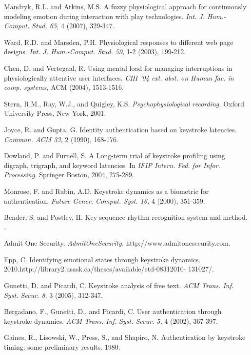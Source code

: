 \begin{thebibliography}{9}
Mandryk, R.L. and Atkins, M.S. A fuzzy physiological
approach for continuously modeling emotion during
interaction with play technologies.
\textit{ Int. J. Hum.-
Comput. Stud. 65,} 4 (2007), 329-347.


Ward, R.D. and Marsden, P.H. Physiological responses
to different web page designs.
\textit{ Int. J. Hum.-Comput.
Stud. 59, } 1-2 (2003), 199-212.


Chen, D. and Vertegaal, R. Using mental load for
managing interruptions in physiologically attentive
user interfaces.
\textit{ CHI '04 ext. abst. on Human fac. in
comp. systems, } ACM (2004), 1513-1516.


Stern, R.M., Ray, W.J., and Quigley, K.S.
\textit{ Psychophysiological recording. } Oxford University
Press, New York, 2001.


Joyce, R. and Gupta, G. Identity authentication based
on keystroke latencies.
\textit{ Commun. ACM 33, } 2 (1990),
168-176.

Dowland, P. and Furnell, S. A Long-term trial of
keystroke profiling using digraph, trigraph, and
keyword latencies. In
\textit{ IFIP Intern. Fed. for Infor.
Processing. } Springer Boston, 2004, 275-289.

Monrose, F. and Rubin, A.D. Keystroke dynamics as a biometric for authentication.
\textit{ Future Gener. Comput.
Syst. 16, } 4 (2000), 351-359.


Bender, S. and Postley, H. Key sequence rhythm
recognition system and method. .

Admit One Security.
\textit{ AdmitOneSecurity. } http://www.admitonesecurity.com.


Epp, C. Identifying emotional states through keystroke
dynamics. 2010.http://library2.usask.ca/theses/available/etd-08312010-
131027/.


Gunetti, D. and Picardi, C. Keystroke analysis of free
text.
\textit{ ACM Trans. Inf. Syst. Secur. 8, } 3 (2005), 312-347.


Bergadano, F., Gunetti, D., and Picardi, C. User
authentication through keystroke dynamics.
\textit{ ACM
Trans. Inf. Syst. Secur. 5, } 4 (2002), 367-397.


Gaines, R., Lisowski, W., Press, S., and Shapiro, N.
Authentication by keystroke timing: some preliminary
results. 1980.



\end{thebibliography}
